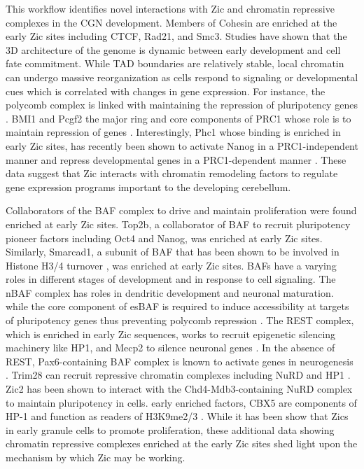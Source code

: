 \documentclass[fleqn,10pt]{wlscirep}
\begin{document}


This workflow identifies novel interactions with Zic and chromatin repressive complexes in the CGN development. Members of Cohesin are enriched at the early Zic sites including CTCF, Rad21, and Smc3. Studies have shown that the 3D architecture of the genome is dynamic between early development and cell fate commitment. While TAD boundaries are relatively stable, local chromatin can undergo massive reorganization as cells respond to signaling or developmental cues which is correlated with changes in gene expression\cite{Zheng2019TheDifferentiation, Bonev2016OrganizationGenome}. For instance, the polycomb complex is linked with maintaining the repression of pluripotency genes \cite{Riising2014GeneWide}. BMI1 and Pcgf2 the major ring  and core components of PRC1 whose role is to maintain repression of genes \cite{Aranda2015RegulationProteins}. Interestingly, Phc1 whose binding is enriched in early Zic sites, has recently been shown to activate  Nanog in a PRC1-independent manner and repress developmental genes in a PRC1-dependent manner \cite{Chen2021Phc1Locus}. These data suggest that Zic interacts with chromatin remodeling factors to regulate gene expression programs important to the developing cerebellum. 

Collaborators of the BAF complex to drive and maintain proliferation were found enriched at early Zic sites. Top2b, a collaborator of BAF to recruit pluripotency pioneer factors including Oct4 and Nanog, was enriched at early Zic sites. Similarly,  Smarcad1, a subunit of BAF that has been shown to be involved in Histone H3/4 turnover \cite{Markert2021Smarcad1Activity}, was  enriched at early Zic sites. BAFs have a varying roles in different stages of development and in response to cell signaling. The nBAF complex has roles in dendritic development and neuronal maturation. \cite{Alfert2019TheDisease} while the core component of esBAF is required to induce accessibility at targets of pluripotency genes thus preventing polycomb repression \cite{Ho2011EsBAFFunction}. The REST complex, which is enriched in early Zic sequences, works to recruit epigenetic silencing machinery like HP1, and Mecp2 to silence neuronal genes \cite{Ballas2005TheGenes}. In the absence of REST, Pax6-containing BAF complex is known to activate genes in neurogenesis \cite{Ninkovic2013TheNetwork, Tuoc2013ChromatinThickness}. Trim28 can recruit repressive chromatin complexes including NuRD and HP1 \cite{Sripathy2006TheRepression}. Zic2 has been shown to interact with the Chd4-Mdb3-containing NuRD complex to maintain pluripotency in cells\cite{Luo2015Zic2Specification}. early enriched factors, CBX5 are components of HP-1 and function as readers of H3K9me2/3 \cite{vanWijnen2021BiologicalDevelopment}. While it has been show that Zics in early granule cells to promote proliferation, these additional data showing chromatin repressive complexes enriched at the early Zic sites shed light upon the mechanism by which Zic may be working. 
\end{document}
